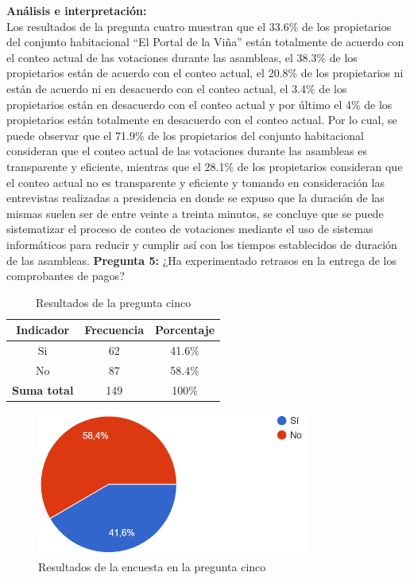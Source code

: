 \textbf{Análisis e interpretación:}\\
Los resultados de la pregunta cuatro muestran que el 33.6\% de los propietarios del conjunto habitacional {\textquotedblleft}El Portal de la Viña{\textquotedblright} están totalmente de acuerdo con el conteo actual de las votaciones durante las asambleas, el 38.3\% de los propietarios están de acuerdo con el conteo actual, el 20.8\% de los propietarios ni están de acuerdo ni en desacuerdo con el conteo actual, el 3.4\% de los propietarios están en desacuerdo con el conteo actual y por último el 4\% de los propietarios están totalmente en desacuerdo con el conteo actual.
Por lo cual, se puede observar que el 71.9\% de los propietarios del conjunto habitacional consideran que el conteo actual de las votaciones durante las asambleas es transparente y eficiente, mientras que el 28.1\% de los propietarios consideran que el conteo actual no es transparente y eficiente y tomando en consideración las entrevistas realizadas a presidencia en donde se expuso que la duración de las mismas suelen ser de entre veinte a treinta minutos, se concluye que se puede sistematizar el proceso de conteo de votaciones mediante el uso de sistemas informáticos para reducir y cumplir así con los tiempos establecidos de duración de las asambleas.
\bigbreak
\textbf{Pregunta 5:} ¿Ha experimentado retrasos en la entrega de los comprobantes de pagos?
    \begin{table}[H]
        \centering
        \caption{Resultados de la pregunta cinco}
        \begin{tabular}{|c|c|c|}
            \hline
            \textbf{Indicador} & \textbf{Frecuencia} &  \textbf{Porcentaje} \\
            \hline
            Si & 62 & 41.6\% \\
            \hline
            No & 87 & 58.4\% \\
            \hline
            \textbf{Suma total} & 149 & 100\% \\
            \hline
        \end{tabular}\label{tab:table_preg_5}
    \end{table}
    \begin{figure}[H]
        \centering
        \includegraphics[width=0.8\textwidth]{resources/images/p5}
        \caption{Resultados de la encuesta en la pregunta cinco}\label{fig:figure_p5}
    \end{figure}

